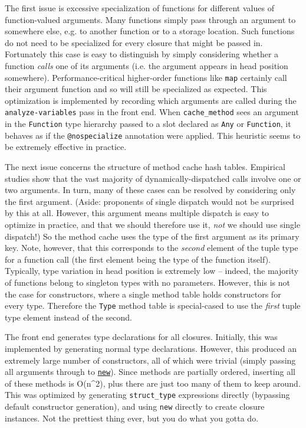 The first issue is excessive specialization of functions for different values of function-valued arguments. Many functions simply {\textquotedbl}pass through{\textquotedbl} an argument to somewhere else, e.g. to another function or to a storage location. Such functions do not need to be specialized for every closure that might be passed in. Fortunately this case is easy to distinguish by simply considering whether a function \emph{calls} one of its arguments (i.e. the argument appears in {\textquotedbl}head position{\textquotedbl} somewhere). Performance-critical higher-order functions like \texttt{map} certainly call their argument function and so will still be specialized as expected. This optimization is implemented by recording which arguments are called during the \texttt{analyze-variables} pass in the front end. When \texttt{cache\_method} sees an argument in the \texttt{Function} type hierarchy passed to a slot declared as \texttt{Any} or \texttt{Function}, it behaves as if the \texttt{@nospecialize} annotation were applied. This heuristic seems to be extremely effective in practice.



The next issue concerns the structure of method cache hash tables. Empirical studies show that the vast majority of dynamically-dispatched calls involve one or two arguments. In turn, many of these cases can be resolved by considering only the first argument. (Aside: proponents of single dispatch would not be surprised by this at all. However, this argument means {\textquotedbl}multiple dispatch is easy to optimize in practice{\textquotedbl}, and that we should therefore use it, \emph{not} {\textquotedbl}we should use single dispatch{\textquotedbl}!) So the method cache uses the type of the first argument as its primary key. Note, however, that this corresponds to the \emph{second} element of the tuple type for a function call (the first element being the type of the function itself). Typically, type variation in head position is extremely low – indeed, the majority of functions belong to singleton types with no parameters. However, this is not the case for constructors, where a single method table holds constructors for every type. Therefore the \texttt{Type} method table is special-cased to use the \emph{first} tuple type element instead of the second.



The front end generates type declarations for all closures. Initially, this was implemented by generating normal type declarations. However, this produced an extremely large number of constructors, all of which were trivial (simply passing all arguments through to \hyperlink{13888762393600028594}{\texttt{new}}). Since methods are partially ordered, inserting all of these methods is O(n{\textasciicircum}2), plus there are just too many of them to keep around. This was optimized by generating \texttt{struct\_type} expressions directly (bypassing default constructor generation), and using \texttt{new} directly to create closure instances. Not the prettiest thing ever, but you do what you gotta do.



